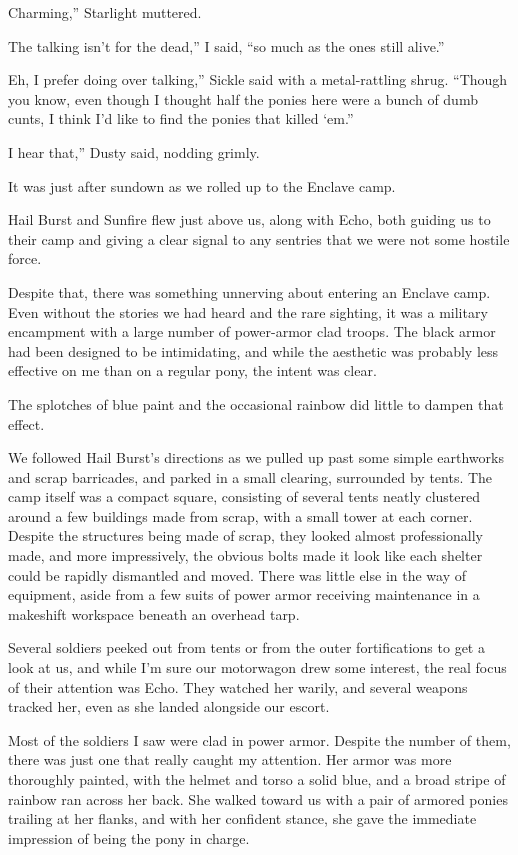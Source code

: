 \leavevmode{}Charming,” Starlight muttered.

\leavevmode{}The talking isn’t for the dead,” I said, “so much as the ones still alive.”

\leavevmode{}Eh, I prefer doing over talking,” Sickle said with a metal-rattling shrug. “Though you know, even though I thought half the ponies here were a bunch of dumb cunts, I think I’d like to find the ponies that killed ‘em.”

\leavevmode{}I hear that,” Dusty said, nodding grimly.

{\br}%
It was just after sundown as we rolled up to the Enclave camp.

Hail Burst and Sunfire flew just above us, along with Echo, both guiding us to their camp and giving a clear signal to any sentries that we were not some hostile force.

Despite that, there was something unnerving about entering an Enclave camp. Even without the stories we had heard and the rare sighting, it was a military encampment with a large number of power-armor clad troops. The black armor had been designed to be intimidating, and while the aesthetic was probably less effective on me than on a regular pony, the intent was clear.

The splotches of blue paint and the occasional rainbow did little to dampen that effect.

We followed Hail Burst’s directions as we pulled up past some simple earthworks and scrap barricades, and parked in a small clearing, surrounded by tents. The camp itself was a compact square, consisting of several tents neatly clustered around a few buildings made from scrap, with a small tower at each corner. Despite the structures being made of scrap, they looked almost professionally made, and more impressively, the obvious bolts made it look like each shelter could be rapidly dismantled and moved. There was little else in the way of equipment, aside from a few suits of power armor receiving maintenance in a makeshift workspace beneath an overhead tarp.

Several soldiers peeked out from tents or from the outer fortifications to get a look at us, and while I’m sure our motorwagon drew some interest, the real focus of their attention was Echo. They watched her warily, and several weapons tracked her, even as she landed alongside our escort.

Most of the soldiers I saw were clad in power armor. Despite the number of them, there was just one that really caught my attention. Her armor was more thoroughly painted, with the helmet and torso a solid blue, and a broad stripe of rainbow ran across her back. She walked toward us with a pair of armored ponies trailing at her flanks, and with her confident stance, she gave the immediate impression of being the pony in charge.

